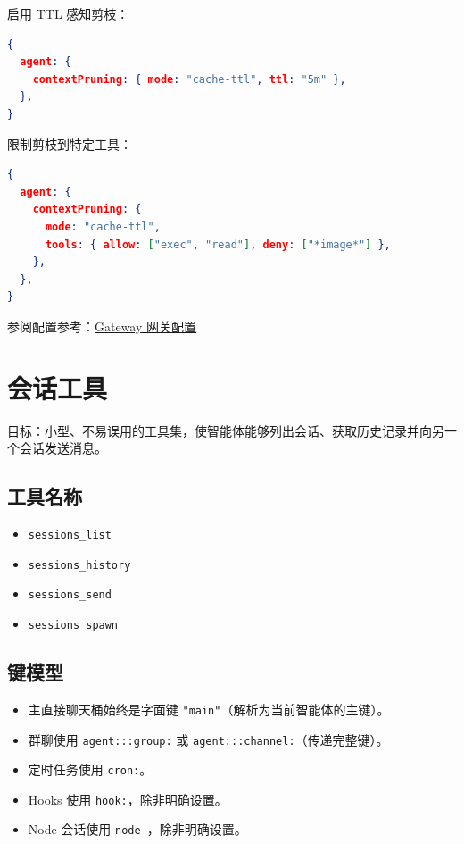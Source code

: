 启用 TTL 感知剪枝：

\begin{lstlisting}[language=json]
{
  agent: {
    contextPruning: { mode: "cache-ttl", ttl: "5m" },
  },
}
\end{lstlisting}


限制剪枝到特定工具：

\begin{lstlisting}[language=json]
{
  agent: {
    contextPruning: {
      mode: "cache-ttl",
      tools: { allow: ["exec", "read"], deny: ["*image*"] },
    },
  },
}
\end{lstlisting}


参阅配置参考：\href{/gateway/configuration}{Gateway 网关配置}


\clearpage

\section{会话工具}


目标：小型、不易误用的工具集，使智能体能够列出会话、获取历史记录并向另一个会话发送消息。

\subsection{工具名称}


\begin{itemize}
  \item \texttt{sessions\_list}
  \item \texttt{sessions\_history}
  \item \texttt{sessions\_send}
  \item \texttt{sessions\_spawn}
\end{itemize}


\subsection{键模型}


\begin{itemize}
  \item 主直接聊天桶始终是字面键 \texttt{"main"}（解析为当前智能体的主键）。
  \item 群聊使用 \texttt{agent:::group:} 或 \texttt{agent:::channel:}（传递完整键）。
  \item 定时任务使用 \texttt{cron:}。
  \item Hooks 使用 \texttt{hook:}，除非明确设置。
  \item Node 会话使用 \texttt{node-}，除非明确设置。
\end{itemize}


